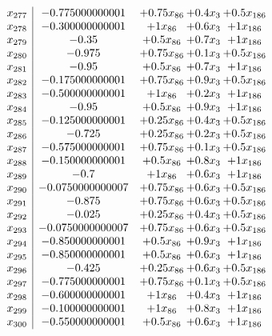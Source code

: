 \documentclass[11pt]{article}
\begin{document}
\[\begin{array}{c| c c@{\hskip 2pt} c@{\hskip 2pt} c@{\hskip 2pt} }
 x_{277}   &  -0.775000000001 & + 0.75 x_{86} & + 0.4 x_{3} & + 0.5 x_{186}\\
 x_{278}   &  -0.300000000001 & + 1 x_{86} & + 0.6 x_{3} & + 1 x_{186}\\
 x_{279}   &  -0.35 & + 0.5 x_{86} & + 0.7 x_{3} & + 1 x_{186}\\
 x_{280}   &  -0.975 & + 0.75 x_{86} & + 0.1 x_{3} & + 0.5 x_{186}\\
 x_{281}   &  -0.95 & + 0.5 x_{86} & + 0.7 x_{3} & + 1 x_{186}\\
 x_{282}   &  -0.175000000001 & + 0.75 x_{86} & + 0.9 x_{3} & + 0.5 x_{186}\\
 x_{283}   &  -0.500000000001 & + 1 x_{86} & + 0.2 x_{3} & + 1 x_{186}\\
 x_{284}   &  -0.95 & + 0.5 x_{86} & + 0.9 x_{3} & + 1 x_{186}\\
 x_{285}   &  -0.125000000001 & + 0.25 x_{86} & + 0.4 x_{3} & + 0.5 x_{186}\\
 x_{286}   &  -0.725 & + 0.25 x_{86} & + 0.2 x_{3} & + 0.5 x_{186}\\
 x_{287}   &  -0.575000000001 & + 0.75 x_{86} & + 0.1 x_{3} & + 0.5 x_{186}\\
 x_{288}   &  -0.150000000001 & + 0.5 x_{86} & + 0.8 x_{3} & + 1 x_{186}\\
 x_{289}   &  -0.7 & + 1 x_{86} & + 0.6 x_{3} & + 1 x_{186}\\
 x_{290}   &  -0.0750000000007 & + 0.75 x_{86} & + 0.6 x_{3} & + 0.5 x_{186}\\
 x_{291}   &  -0.875 & + 0.75 x_{86} & + 0.6 x_{3} & + 0.5 x_{186}\\
 x_{292}   &  -0.025 & + 0.25 x_{86} & + 0.4 x_{3} & + 0.5 x_{186}\\
 x_{293}   &  -0.0750000000007 & + 0.75 x_{86} & + 0.6 x_{3} & + 0.5 x_{186}\\
 x_{294}   &  -0.850000000001 & + 0.5 x_{86} & + 0.9 x_{3} & + 1 x_{186}\\
 x_{295}   &  -0.850000000001 & + 0.5 x_{86} & + 0.6 x_{3} & + 1 x_{186}\\
 x_{296}   &  -0.425 & + 0.25 x_{86} & + 0.6 x_{3} & + 0.5 x_{186}\\
 x_{297}   &  -0.775000000001 & + 0.75 x_{86} & + 0.1 x_{3} & + 0.5 x_{186}\\
 x_{298}   &  -0.600000000001 & + 1 x_{86} & + 0.4 x_{3} & + 1 x_{186}\\
 x_{299}   &  -0.100000000001 & + 1 x_{86} & + 0.8 x_{3} & + 1 x_{186}\\
 x_{300}   &  -0.550000000001 & + 0.5 x_{86} & + 0.6 x_{3} & + 1 x_{186}\\

\end{array}\]
\end{document}
